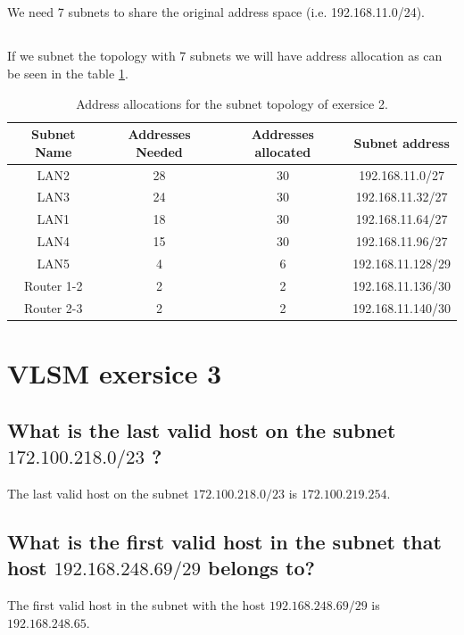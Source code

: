 \documentclass{article}
\begin{document}
\subsection{}

We need 7 subnets to share the original address space (i.e. 192.168.11.0/24). 

\subsection{}

If we subnet the topology with 7 subnets we will have address allocation as can be seen in the table \ref{tab:2-subnet}. 

\begin{table}[!h]
    \centering
    \begin{tabular}{|c|c|c|c|}
    \hline
    Subnet Name & Addresses Needed & Addresses allocated & Subnet address\\
    \hline
         LAN2 &  28 & 30 & 192.168.11.0/27 \\
         LAN3 &  24 & 30 & 192.168.11.32/27 \\
         LAN1 & 18 & 30 & 192.168.11.64/27 \\
         LAN4 & 15 & 30 & 192.168.11.96/27 \\
         LAN5 & 4 & 6 & 192.168.11.128/29 \\ 
        Router 1-2 & 2 & 2 & 192.168.11.136/30\\
        Router 2-3 & 2 &2 & 192.168.11.140/30 \\
        \hline
    \end{tabular}
    \caption{Address allocations for the subnet topology of exersice 2.}
    \label{tab:2-subnet}
\end{table}




\section{VLSM exersice 3}

\subsection{What is the last valid host on the subnet $172.100.218.0/23$ ? }

The last valid host on the subnet $172.100.218.0/23$ is $172.100.219.254$.

\subsection{What is the first valid host in the subnet that host $192.168.248.69/29$ belongs to?}
The first valid host in the subnet with the host $192.168.248.69/29$ is $192.168.248.65$.
\end{document}
